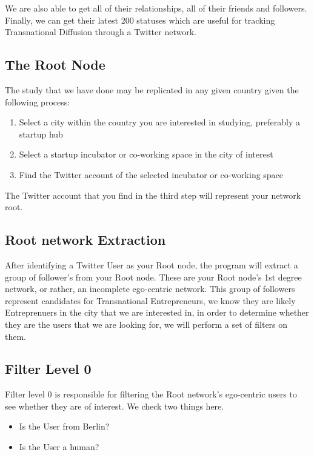 We are also able to get all of their relationships, all of their friends and followers. Finally, we can get their latest 200 statuses which are useful for tracking Transnational Diffusion through a Twitter network.

\subsection{The Root Node}
The study that we have done may be replicated in any given country given the following process:

\begin{enumerate}
\item Select a city within the country you are interested in studying, preferably a startup hub
\item Select a startup incubator or co-working space in the city of interest
\item Find the Twitter account of the selected incubator or co-working space
\end{enumerate}

The Twitter account that you find in the third step will represent your network root.

\subsection{Root network Extraction}
After identifying a Twitter User as your Root node, the program will extract a group of follower's from your Root node. These are your Root node's 1st degree network, or rather, an incomplete ego-centric network. This group of followers represent candidates for Transnational Entrepreneurs, we know they are likely Entreprenuers in the city that we are interested in, in order to determine whether they are the users that we are looking for, we will perform a set of filters on them.

\subsection{Filter Level 0}
Filter level 0 is responsible for filtering the Root network's ego-centric users to see whether they are of interest. We check two things here.

\begin{itemize}
\item Is the User from Berlin?
\item Is the User a human?
\end{itemize}

